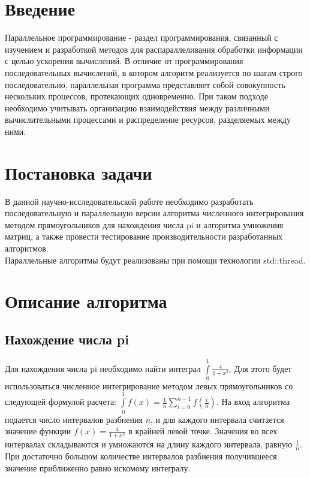 \documentclass{report}
\begin{document}
\section*{Введение}
\par Параллельное программирование - раздел программирования, связанный с изучением и разработкой методов для распараллеливания обработки информации с целью ускорения вычислений. В отличие от программирования последовательных вычислений, в котором алгоритм реализуется по шагам строго последовательно, параллельная программа представляет собой совокупность нескольких процессов, протекающих одновременно. При таком подходе необходимо учитывать организацию взаимодействия между различными вычислительными процессами и распределение ресурсов, разделяемых между ними.
\clearpage

\section*{Постановка задачи}
\par В данной научно-исследовательской работе необходимо разработать последовательную и параллельную версии алгоритма численного интегрирования методом прямоугольников для нахождения числа pi и алгоритма умножения матриц, а также провести тестирование производительности разработанных алгоритмов.\\
Параллельные алгоритмы будут реализованы при помощи технологии std::thread.
\clearpage

\section*{Описание алгоритма}
\subsection*{Нахождение числа pi}
\par Для нахождения числа pi необходимо найти интеграл \( \int\limits_{0}^{1} \frac{4}{1 + x^{2}} \). Для этого будет использоваться численное интегрирование методом левых прямоугольников со следующей формулой расчета: \( \int\limits_{0}^{1} f(x) = \frac{1}{n} \sum\limits_{i = 0}^{n - 1} f(\frac{i}{n}) \). На вход алгоритма подается число интервалов разбиения \( n \), и для каждого интервала считается значение функции \( f(x) = \frac{4}{1 + x^{2}}\) в крайней левой точке. Значения во всех интервалах складываются и умножаются на длину каждого интервала, равную \( \frac{1}{n} \). При достаточно большом количестве интервалов разбиения получившееся значение приближенно равно искомому интегралу.
\end{document}
